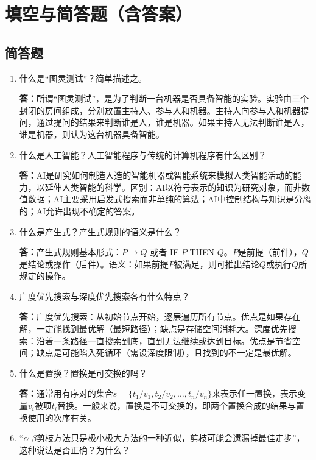 \documentclass[12pt,a4paper,openany]{ctexbook}
\begin{document}
\chapter{填空与简答题（含答案）}

\section{简答题}

\begin{enumerate}[leftmargin=2em,itemsep=1em]
\item 什么是“图灵测试”？简单描述之。

\textbf{答：}所谓“图灵测试”，是为了判断一台机器是否具备智能的实验。实验由三个封闭的房间组成，分别放置主持人、参与人和机器。主持人向参与人和机器提问，通过提问的结果来判断谁是人，谁是机器。如果主持人无法判断谁是人，谁是机器，则认为这台机器具备智能。

\item 什么是人工智能？人工智能程序与传统的计算机程序有什么区别？

\textbf{答：}AI是研究如何制造人造的智能机器或智能系统来模拟人类智能活动的能力，以延伸人类智能的科学。区别：AI以符号表示的知识为研究对象，而非数值数据；AI主要采用启发式搜索而非单纯的算法；AI中控制结构与知识是分离的；AI允许出现不确定的答案。

\item 什么是产生式？产生式规则的语义是什么？

\textbf{答：}产生式规则基本形式：$P \to Q$ 或者 IF $P$ THEN $Q$。$P$是前提（前件），$Q$是结论或操作（后件）。语义：如果前提$P$被满足，则可推出结论$Q$或执行$Q$所规定的操作。

\item 广度优先搜索与深度优先搜索各有什么特点？

\textbf{答：}广度优先搜索：从初始节点开始，逐层遍历所有节点。优点是如果存在解，一定能找到最优解（最短路径）；缺点是存储空间消耗大。深度优先搜索：沿着一条路径一直搜索到底，直到无法继续或达到目标。优点是节省空间；缺点是可能陷入死循环（需设深度限制），且找到的不一定是最优解。

\item 什么是置换？置换是可交换的吗？

\textbf{答：}通常用有序对的集合$s=\{t_1/v_1, t_2/v_2, \dots, t_n/v_n\}$来表示任一置换，表示变量$v_i$被项$t_i$替换。一般来说，置换是不可交换的，即两个置换合成的结果与置换使用的次序有关。

\item “$\alpha$-$\beta$剪枝方法只是极小极大方法的一种近似，剪枝可能会遗漏掉最佳走步”，这种说法是否正确？为什么？


\end{enumerate}
\end{document}
